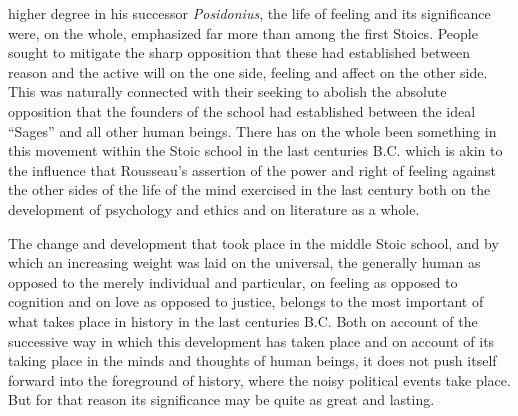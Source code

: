 \documentclass[12pt,a4paper,openany]{book}
\newcommand{\opage}[1]{\marginnote{\footnotesize\textit{[#1]}}}
\begin{document}
higher degree in his successor \emph{Posidonius}, the
life of feeling and its significance were, on the whole, emphasized far more than among
the first Stoics. People sought to mitigate the sharp
opposition that these had established between reason and the active
will on the one side, feeling and affect on the other
side. This was naturally connected with their seeking to
abolish the absolute opposition that the founders of the school had
\opage{172}established between the ideal ``Sages'' and all other human beings.
There has on the whole been something in this movement within
the Stoic school in the last centuries B.C. which is
akin to the influence that Rousseau's assertion of the
power and right of feeling against the other sides of the life of the mind exercised in
the last century both on the development of psychology and ethics
and on literature as a whole.

The change and development that took place in the
middle Stoic school, and by which an increasing
weight was laid on the universal, the generally human as opposed
to the merely individual and particular, on feeling as
opposed to cognition and on love as opposed to
justice, belongs to the most important of what takes place
in history in the last centuries B.C. Both on account
of the successive way in which this development has taken place
and on account of its taking place in the minds
and thoughts of human beings, it does not push itself forward into the foreground of history,
where the noisy political events take place.
But for that reason its significance may be quite as great and lasting.
\end{document}
